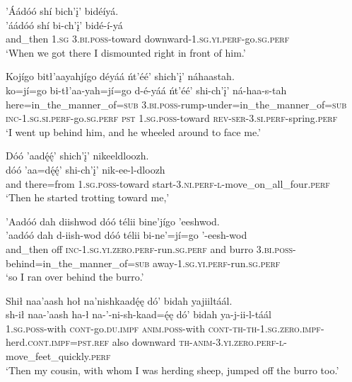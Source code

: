 \ea\label{ex:text6-8-2}
’Áádóó shí bich’į’ bidéíyá.\\
\gll ’áádóó	shí	bi-ch’į’	bidé-í-yá\\
     and\_then	1.\textsc{sg}	3.\textsc{bi}.\textsc{poss}-toward	downward-1.\textsc{sg}.\textsc{yi}.\textsc{perf}-go.\textsc{sg}.\textsc{perf}\\
\glt `When we got there I dismounted right in front of him.'
\z

\ea\label{ex:text6-8-3}
Kojígo bitł’aayahjígo déyáá ńt’éé’ shich’į’ náhaastah.\\
\gll ko=jí=go	bi-tł’aa-yah=jí=go	d-é-yáá	ńt’éé’	shi-ch’į’	ná-haa-s-tah\\
     here=in\_the\_manner\_of=\textsc{sub}	3.\textsc{bi}.\textsc{poss}-rump-under=in\_the\_manner\_of=\textsc{sub}	\textsc{inc}-1.\textsc{sg}.\textsc{si}.\textsc{perf}-go.\textsc{sg}.\textsc{perf}	\textsc{pst}	1.\textsc{sg}.\textsc{poss}-toward	\textsc{rev}-\textsc{ser}-3.\textsc{si}.\textsc{perf}-spring.\textsc{perf}\\
\glt `I went up behind him, and he wheeled around to face me.'
\z

\ea\label{ex:text6-8-4}
Dóó ’aadę́ę́’ shich’į’ nikeeldloozh.\\
\gll dóó	’aa=dę́ę́’	shi-ch’į’	nik-ee-l-dloozh\\
     and	there=from	1.\textsc{sg}.\textsc{poss}-toward	start-3.\textsc{ni}.\textsc{perf}-\textsc{l}-move\_on\_all\_four.\textsc{perf}\\
\glt `Then he started trotting toward me,'
\z

\ea\label{ex:text6-8-5}
’Aadóó dah diishwod dóó télii bine’jígo ’eeshwod.\\
\gll ’aadóó	dah	d-iish-wod	dóó	télii	bi-ne’=jí=go	’-eesh-wod\\
     and\_then	off	\textsc{inc}-1.\textsc{sg}.\textsc{yi}.\textsc{zero}.\textsc{perf}-run.\textsc{sg}.\textsc{perf}	and	burro	3.\textsc{bi}.\textsc{poss}-behind=in\_the\_manner\_of=\textsc{sub}	away-1.\textsc{sg}.\textsc{yi}.\textsc{perf}-run.\textsc{sg}.\textsc{perf}\\
\glt `so I ran over behind the burro.'
\z

\ea\label{ex:text6-8-6}
Shił naa’aash hoł na’nishkaadę́ę dó’ bidah yajiiltáál.\\
\gll sh-ił	naa-’aash	ha-ł	na-’-ni-sh-kaad=ę́ę	dó’	bidah	ya-j-ii-l-táál\\
     1.\textsc{sg}.\textsc{poss}-with	\textsc{cont}-go.\textsc{du}.\textsc{impf}	\textsc{anim}.\textsc{poss}-with	\textsc{cont}-\textsc{th}-\textsc{th}-1.\textsc{sg}.\textsc{zero}.\textsc{impf}-herd.\textsc{cont}.\textsc{impf}=\textsc{pst}.\textsc{ref}	also	downward	\textsc{th}-\textsc{anim}-3.\textsc{yi}.\textsc{zero}.\textsc{perf}-\textsc{l}-move\_feet\_quickly.\textsc{perf}\\
\glt `Then my cousin, with whom I was herding sheep, jumped off the burro too.'
\z


